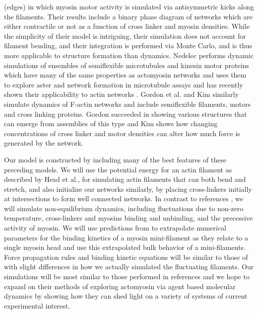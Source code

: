 \documentclass[12pt]{article}
\begin{document}
(edges) in which myosin motor activity is simulated via antisymmetric kicks along the filaments. Their results include a
binary phase diagram of networks which are either contractile or not as a function of cross linker and myosin
densities. While the simplicity of their model is intriguing, their simulation does not account for filament bending, 
and their integration is performed via Monte Carlo, and is thus more applicable to structure formation than dynamics.
Nedelec performs dynamic simulations of ensembles of semiflexible microtubules and kinesin motor proteins
which have many of the same properties as actomyosin networks and uses them to explore aster and network formation in microtubule
assays \cite{nedelec2007} and has recently shown their applicability to actin networks \cite{ennomani2016}.
Gordon et al. \cite{gordon2012} and Kim \cite{kim2014} similarly simulate dynamics of F-actin networks and include
semiflexible filaments, motors and cross linking proteins. Gordon succeeded in showing various structures that can emerge
from assemblies of this type and Kim shows how changing concentrations of cross linker and motor densities can alter how
much force is generated by the network.
\par
Our model is constructed by including many of the best features of these preceding models.
We will use the potential energy for an actin filament as described by Head et al., for simulating actin filaments that can 
both bend and stretch, and also initialize our networks similarly, by placing cross-linkers initially at intersections 
to form well connected networks. In contrast to references \cite{head2003, dasanyake2011}, we will 
simulate non-equilibrium dynamics, including fluctuations due to non-zero temperature,  
cross-linkers and myosins binding and unbinding, and the precessive activity of myosin.  
We will use predictions from \cite{stam2015} to extrapolate numerical
parameters for the binding kinetics of a myosin mini-filament as they relate to a single myosin head and use this extrapolated
bulk behavior of a mini-filaments. Force propagation rules and binding kinetic equations will be similar to those of
\cite{nedelec2007, gordon2012} with slight differences in how we actually simulated the fluctuating filaments. 
Our simulations will be most similar to those performed in references \cite{kim2014, ennomani2016} and we hope to
expand on their methods of exploring actomyosin via agent based molecular dynamics by showing how they can shed light on 
a variety of systems of current experimental interest.
\end{document}
